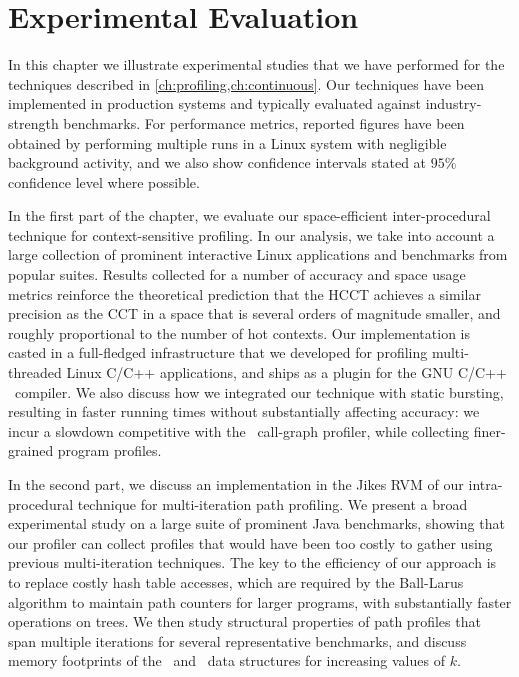 \chapter{Experimental Evaluation}
\label{ch:experiments}

In this chapter we illustrate experimental studies that we have performed for the techniques described in \mychapter\ref{ch:profiling,ch:continuous}. Our techniques have been implemented in production systems and typically evaluated against industry-strength benchmarks. For performance metrics, reported figures have been obtained by performing multiple runs in a Linux system with negligible background activity, and we also show confidence intervals stated at $95\%$ confidence level where possible.

In the first part of the chapter, we evaluate our space-efficient inter-procedural technique for context-sensitive profiling. In our analysis, we take into account a large collection of prominent interactive Linux applications and benchmarks from popular suites. Results collected for a number of accuracy and space usage metrics reinforce the theoretical prediction that the HCCT achieves a similar precision as the CCT in a space that is several orders of magnitude smaller, and roughly proportional to the number of hot contexts. Our implementation is casted in a full-fledged infrastructure that we developed for profiling multi-threaded Linux C/C++ applications, and ships as a plugin for the GNU C/C++ \gcc\ compiler. We also discuss how we integrated our technique with static bursting, resulting in faster running times without substantially affecting accuracy: we incur a slowdown competitive with the \gprof\ call-graph profiler, while collecting finer-grained program profiles. 

In the second part, we discuss an implementation in the Jikes RVM of our intra-procedural technique for multi-iteration path profiling. We present a broad experimental study on a large suite of prominent Java benchmarks, showing that our profiler can collect profiles that would have been too costly to gather using previous multi-iteration techniques. The key to the efficiency of our approach is to replace costly hash table accesses, which are  required by the Ball-Larus algorithm to maintain path counters for larger programs, with substantially faster operations on trees. We then study structural properties of path profiles that span multiple iterations for several representative benchmarks, and discuss memory footprints of the \ksf\ and \kipf\ data structures for increasing values of $k$.

